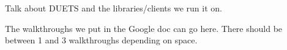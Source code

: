 \label{sec:evaluation}

Talk about DUETS and the libraries/clients we run it on.

The walkthroughs we put in the Google doc can go here. There should be 
between 1 and 3 walkthroughs depending on space.

